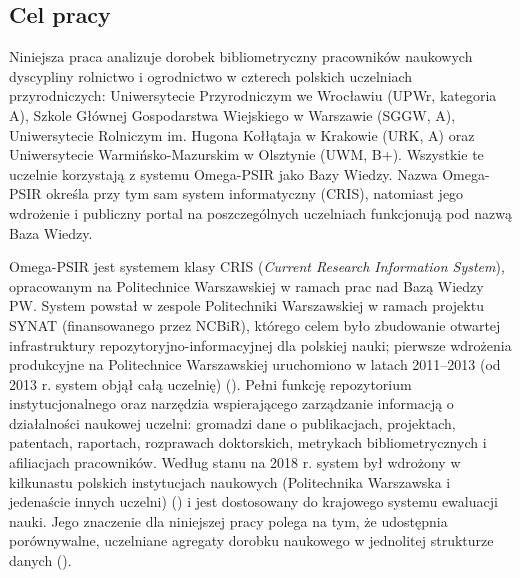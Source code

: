 \documentclass[
  polish,
  12pt,
  a4paper,
]{article}
\begin{document}
\newpage{}

\subsection{Cel pracy}\label{cel-pracy}

Niniejsza praca analizuje dorobek bibliometryczny pracowników naukowych
dyscypliny rolnictwo i ogrodnictwo w czterech polskich uczelniach
przyrodniczych: Uniwersytecie Przyrodniczym we Wrocławiu (UPWr,
kategoria A), Szkole Głównej Gospodarstwa Wiejskiego w Warszawie (SGGW,
A), Uniwersytecie Rolniczym im. Hugona Kołłątaja w Krakowie (URK, A)
oraz Uniwersytecie Warmińsko-Mazurskim w Olsztynie (UWM, B+). Wszystkie
te uczelnie korzystają z systemu Omega-PSIR jako Bazy Wiedzy. Nazwa
Omega-PSIR określa przy tym sam system informatyczny (CRIS), natomiast
jego wdrożenie i publiczny portal na poszczególnych uczelniach
funkcjonują pod nazwą Baza Wiedzy.

Omega-PSIR jest systemem klasy CRIS (\emph{Current Research Information
System}), opracowanym na Politechnice Warszawskiej w ramach prac nad
Bazą Wiedzy PW. System powstał w zespole Politechniki Warszawskiej w
ramach projektu SYNAT (finansowanego przez NCBiR), którego celem było
zbudowanie otwartej infrastruktury repozytoryjno-informacyjnej dla
polskiej nauki; pierwsze wdrożenia produkcyjne na Politechnice
Warszawskiej uruchomiono w latach 2011--2013 (od 2013 r. system objął
całą uczelnię) ().
Pełni funkcję repozytorium instytucjonalnego oraz narzędzia
wspierającego zarządzanie informacją o działalności naukowej uczelni:
gromadzi dane o publikacjach, projektach, patentach, raportach,
rozprawach doktorskich, metrykach bibliometrycznych i afiliacjach
pracowników. Według stanu na 2018 r. system był wdrożony w kilkunastu
polskich instytucjach naukowych (Politechnika Warszawska i jedenaście
innych uczelni)
() i jest dostosowany do krajowego systemu ewaluacji nauki. Jego
znaczenie dla niniejszej pracy polega na tym, że udostępnia
porównywalne, uczelniane agregaty dorobku naukowego w jednolitej
strukturze danych ().
\end{document}
